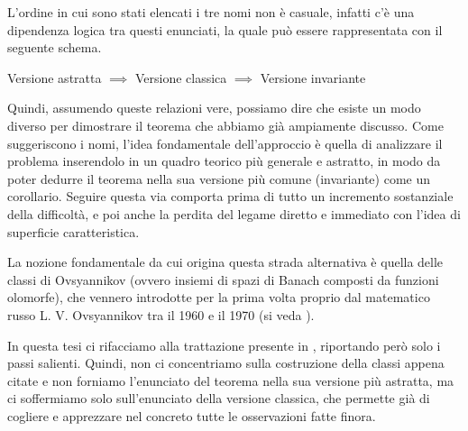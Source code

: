 L'ordine in cui sono stati elencati i tre nomi non è casuale, infatti c'è una dipendenza logica tra questi enunciati, la quale può essere rappresentata con il seguente schema.

\begin{center}
Versione astratta $\implies$ Versione classica $\implies$ Versione invariante
\end{center}

Quindi, assumendo queste relazioni vere, possiamo dire che esiste un modo diverso per dimostrare il teorema che abbiamo già ampiamente discusso. 
Come suggeriscono i nomi, l'idea fondamentale dell'approccio è quella di analizzare il problema inserendolo in un quadro teorico più generale e astratto, in modo da poter dedurre il teorema nella sua versione più comune (invariante) come un corollario.
Seguire questa via comporta prima di tutto un incremento sostanziale della difficoltà, e poi anche la perdita del legame diretto e immediato con l'idea di superficie caratteristica.

La nozione fondamentale da cui origina questa strada alternativa è quella delle classi di Ovsyannikov (ovvero insiemi di spazi di Banach composti da funzioni olomorfe), che vennero introdotte per la prima volta proprio dal matematico russo L. V. Ovsyannikov tra il 1960 e il 1970 (si veda \cite{Ovsyannikov}).

In questa tesi ci rifacciamo alla trattazione presente in \cite[cap.17-19]{Treves}, riportando però solo i passi salienti. Quindi, non ci concentriamo sulla costruzione della classi appena citate e non forniamo l'enunciato del teorema nella sua versione più astratta, ma ci soffermiamo solo sull'enunciato della versione classica, che permette già di cogliere e apprezzare nel concreto tutte le osservazioni fatte finora.

\begin{theorem}
\end{theorem}

